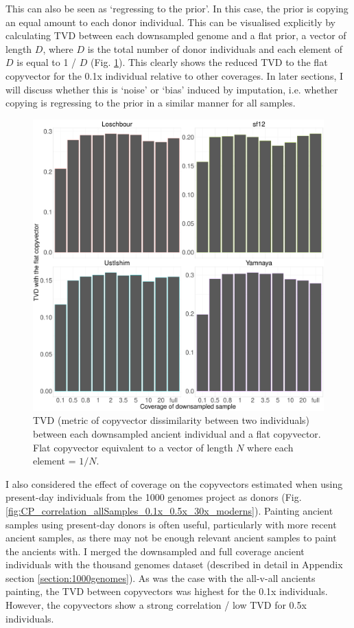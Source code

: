 This can also be seen as `regressing to the prior'. In this case, the prior is copying an equal amount to each donor individual. This can be visualised explicitly by calculating TVD between each downsampled genome and a flat prior, a vector of length $D$, where $D$ is the total number of donor individuals and each element of $D$ is equal to 1 / $D$ (Fig. \ref{fig:TVD_ancients_flat_prior}). This clearly shows the reduced TVD to the flat copyvector for the 0.1x individual relative to other coverages. In later sections, I will discuss whether this is `noise' or `bias' induced by imputation, i.e.  whether copying is regressing to the prior in a similar manner for all samples. 

\begin{figure}[htp]
    \centering
    \includegraphics[width=1.0\textwidth]{../images/chapter1/TVD_ancients_flat_prior.pdf}
    \caption{TVD (metric of copyvector dissimilarity between two individuals) between each downsampled ancient individual and a flat copyvector. Flat copyvector equivalent to a vector of length $N$ where each element = $1/N$.}
    \label{fig:TVD_ancients_flat_prior}
\end{figure}

I also considered the effect of coverage on the copyvectors estimated when using present-day individuals from the 1000 genomes project as donors (Fig. \ref{fig:CP_correlation_allSamples_0.1x_0.5x_30x_moderns}). Painting ancient samples using present-day donors is often useful, particularly with more recent ancient samples, as there may not be enough relevant ancient samples to paint the ancients with. I merged the downsampled and full coverage ancient individuals with the thousand genomes dataset (described in detail in Appendix section \ref{section:1000genomes}). As was the case with the all-v-all ancients painting, the TVD between copyvectors was highest for the 0.1x individuals. However, the copyvectors show a strong correlation / low TVD for 0.5x individuals. 

